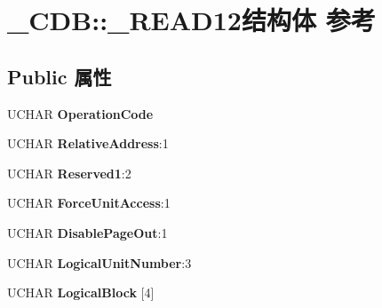 \hypertarget{struct___c_d_b_1_1___r_e_a_d12}{}\section{\+\_\+\+C\+DB\+:\+:\+\_\+\+R\+E\+A\+D12结构体 参考}
\label{struct___c_d_b_1_1___r_e_a_d12}
\subsection*{Public 属性}
\begin{DoxyCompactItemize}
\item 
\mbox{\label{struct___c_d_b_1_1___r_e_a_d12_a256dce15731c7d3c8383ef01f0fda15e}} 
U\+C\+H\+AR {\bfseries Operation\+Code}
\item 
\mbox{\label{struct___c_d_b_1_1___r_e_a_d12_ad41a495324dd4ee08309df5cecfb4152}} 
U\+C\+H\+AR {\bfseries Relative\+Address}\+:1
\item 
\mbox{\label{struct___c_d_b_1_1___r_e_a_d12_aeeb53b1961635e3d0bbc65f25eda32dc}} 
U\+C\+H\+AR {\bfseries Reserved1}\+:2
\item 
\mbox{\label{struct___c_d_b_1_1___r_e_a_d12_ab92f910013ceb0beb67c0bee86edfcdc}} 
U\+C\+H\+AR {\bfseries Force\+Unit\+Access}\+:1
\item 
\mbox{\label{struct___c_d_b_1_1___r_e_a_d12_a8c3bf685517335bb7f6da51592cfe693}} 
U\+C\+H\+AR {\bfseries Disable\+Page\+Out}\+:1
\item 
\mbox{\label{struct___c_d_b_1_1___r_e_a_d12_a95ac1533c09e852f69f389b54d510203}} 
U\+C\+H\+AR {\bfseries Logical\+Unit\+Number}\+:3
\item 
\mbox{\label{struct___c_d_b_1_1___r_e_a_d12_a511737d43fbc7205cc1d7b1bc53ae93f}} 
U\+C\+H\+AR {\bfseries Logical\+Block} \mbox{[}4\mbox{]}
\item 
\mbox{\label{struct___c_d_b_1_1___r_e_a_d12_a89268f250d4667d0c6cbcdb33cd65434}} 

\end{DoxyCompactItemize}
